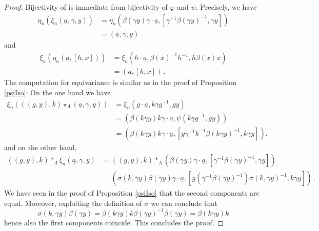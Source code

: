 \documentclass[11pt, oneside]{amsart}
\theoremstyle{definition}
\theoremstyle{remark}
\theoremstyle{TheoremNum}
\begin{document}
\begin{proof} Bijectivity of is immediate from bijectivity of $\varphi$ and $\psi$. Precisely, we have
\begin{align*}
  \eta_n(\xi_n(\underline{a},\gamma,y))&=\eta_n(\beta(\gamma y)\gamma \cdot \underline{a},[\gamma^{-1}\beta(\gamma y)^{-1},\gamma y])\\
  &= (\underline{a}, \gamma,y)
\end{align*}  
and 
\begin{align*}
  \xi_n(\eta_n(\underline{a}, [h,x]))&=\xi_n(h\cdot \underline{a},\beta(x)^{-1} h^{-1},h\beta(x)x)\\
  &= (\underline{a}, [h,x])\,.
\end{align*} 
The computation for equivariance is similar as in the proof of Proposition \ref{psiIso}: On the one hand we have
\begin{align*}
    \xi_n(((g,y),k)\star_A (\underline{a}, \gamma,y))&=\xi_n(g\cdot \underline{a}, k\gamma g^{-1},gy)\\
    &=(\beta(k\gamma y)k\gamma  \cdot \underline{a}, \psi(k\gamma g^{-1},gy))\\
    &=(\beta(k\gamma y)k\gamma \cdot \underline{a}, [g\gamma^{-1}k^{-1} \beta(k\gamma y)^{-1},k\gamma y]),
\end{align*}
and on the other hand,
\begin{align*}
   ((g,y),k)  \ast_A \xi_n(\underline{a}, \gamma,y)&=   ((g,y),k)\ast_A  (\beta(\gamma y)\gamma \cdot \underline{a},[\gamma^{-1}\beta(\gamma y)^{-1},\gamma y])\\
   &=(\sigma(k,\gamma y)\beta(\gamma y)\gamma \cdot \underline{a},[g(\gamma^{-1}\beta(\gamma y)^{-1})\sigma(k,\gamma y)^{-1},k\gamma y])\,.
\end{align*}
We have seen in the proof of Proposition \ref{psiIso} that the second components are equal. Moreover, exploiting the definition of $\sigma$ we can conclude that 
$$\sigma(k,\gamma y)\beta(\gamma y)=\beta(k\gamma y)k\beta(\gamma y)^{-1}\beta(\gamma y)=\beta(k\gamma y)k$$
hence also the first components coincide.
This concludes the proof.
\end{proof}
\end{document}
